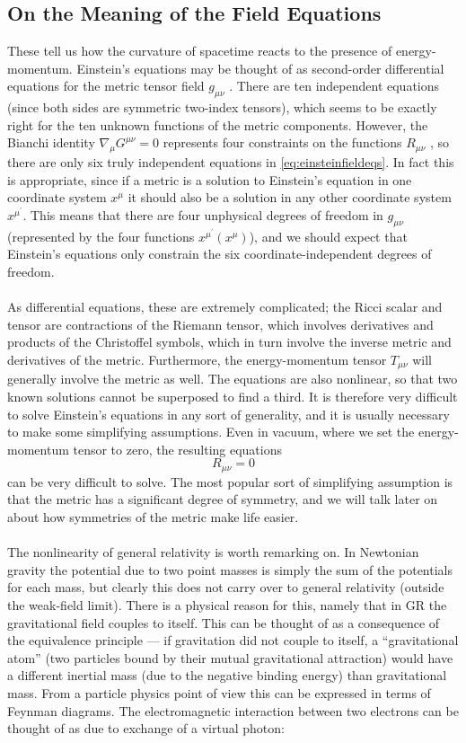 \subsection{On the Meaning of the Field Equations}
These tell us how the curvature of spacetime reacts to the presence of energy-momentum.
Einstein’s equations may be thought of as second-order differential equations for the
metric tensor field $g_{μν}$ . There are ten independent equations (since both sides are symmetric
two-index tensors), which seems to be exactly right for the ten unknown functions of the
metric components. However, the Bianchi identity $∇_μ G^{μν} = 0$ represents four constraints on
the functions $R_{μν}$ , so there are only six truly independent equations in \ref{eq:einsteinfieldeqs}. In fact this is
appropriate, since if a metric is a solution to Einstein’s equation in one coordinate system $x^\mu$ it should also be a solution in any other coordinate system $x^{\mu^\prime}$. This means that there are
four unphysical degrees of freedom in $g_{μν}$ (represented by the four functions $x^{μ^\prime} (x^μ )$), and
we should expect that Einstein’s equations only constrain the six coordinate-independent
degrees of freedom.\\
\\
As differential equations, these are extremely complicated; the Ricci scalar and tensor are
contractions of the Riemann tensor, which involves derivatives and products of the Christoffel
symbols, which in turn involve the inverse metric and derivatives of the metric. Furthermore,
the energy-momentum tensor $T_{μν}$ will generally involve the metric as well. The equations
are also nonlinear, so that two known solutions cannot be superposed to find a third. It
is therefore very difficult to solve Einstein’s equations in any sort of generality, and it is
usually necessary to make some simplifying assumptions. Even in vacuum, where we set the
energy-momentum tensor to zero, the resulting equations
\begin{equation}
	R_{\mu \nu} = 0
\end{equation}
can be very difficult to solve. The most popular sort of simplifying assumption is that the
metric has a significant degree of symmetry, and we will talk later on about how symmetries
of the metric make life easier.
\\
\\
The nonlinearity of general relativity is worth remarking on. In Newtonian gravity the
potential due to two point masses is simply the sum of the potentials for each mass, but clearly this does not carry over to general relativity (outside the weak-field limit). There is
a physical reason for this, namely that in GR the gravitational field couples to itself. This
can be thought of as a consequence of the equivalence principle — if gravitation did not
couple to itself, a “gravitational atom” (two particles bound by their mutual gravitational
attraction) would have a different inertial mass (due to the negative binding energy) than
gravitational mass.
From a particle physics point of view this can be expressed in terms of
Feynman diagrams. The electromagnetic interaction between two electrons can be thought
of as due to exchange of a virtual photon:

